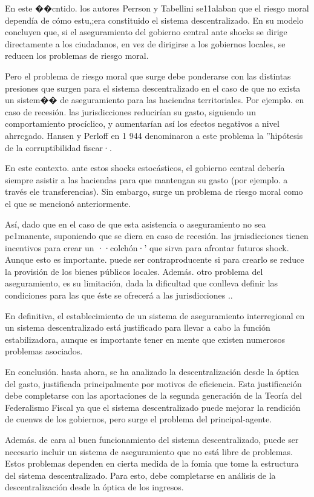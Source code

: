 \documentclass[10pt,a4paper]{article}
\begin{document}
En este ��cntido. los autores Perrson y Tabellini se11alaban que el riesgo moral dependía de cómo estu,;era constituido el sistema descentralizado. En su modelo concluyen que, si el aseguramiento del gobierno central ante shocks se dirige directamente a los ciudadanos, en vez de dirigirse a los gobiernos locales, se reducen los problemas de riesgo moral. 

Pero el problema de riesgo moral que surge debe ponderarse con las distintas presiones que surgen para el sistema descentralizado en el caso de que no exista un sistem�� de aseguramiento para las  haciendas territoriales. Por ejemplo. en caso de recesión. las jurisdicciones reducirían su gasto, siguiendo un comportamiento procíclico, y aumentarían así los efectos negativos a nivel ahrrcgado. Hansen y Perloff en 1 944 denominaron a este problema la ''hipótesis de la corruptibilidad fiscar·.

En este contexto. ante estos shocks estocásticos, el gobierno central debería siempre asistir a las haciendas para que mantengan su gasto (por ejemplo. a través ele transferencias). Sin embargo, surge un problema de riesgo moral como el que se mencionó anteriormente.

Así, dado que en el caso de que esta asistencia o aseguramiento no sea pe1manente, suponiendo que se diera en caso de recesión. las jrnisdicciones tienen incentivos para crear un ··colchón·' que sirva para afrontar futuros shock\·. Aunque esto es importante. puede ser contraproducente si para crearlo se reduce la provisión de los bienes públicos locales. Además. otro problema del aseguramiento, es su limitación, dada la dificultad que conlleva definir las condiciones para las que éste se ofrecerá a las jurisdicciones ..

En definitiva, el establecimiento de un sistema de aseguramiento interregional en un sistema descentralizado está justificado para llevar a cabo la función estabilizadora, aunque es importante tener en mente que existen numerosos problemas asociados.

En conclusión. hasta ahora, se ha analizado la descentralización desde la óptica del gasto, justificada principalmente por motivos de eficiencia. Esta justificación debe completarse con las aportaciones de la segunda generación de la Teoría del Federalismo Fiscal ya que el sistema descentralizado puede mejorar la rendición de cuenws de los gobiernos, pero surge el problema del principal-agente.

Además. de cara al buen funcionamiento del sistema descentralizado, puede ser necesario incluir un sistema de aseguramiento que no está libre de problemas. Estos problemas dependen en cierta medida de la fomia que tome la estructura del sistema descentralizado. Para esto, debe completarse en análisis de la descentralización desde la óptica de los ingresos.
\end{document}
